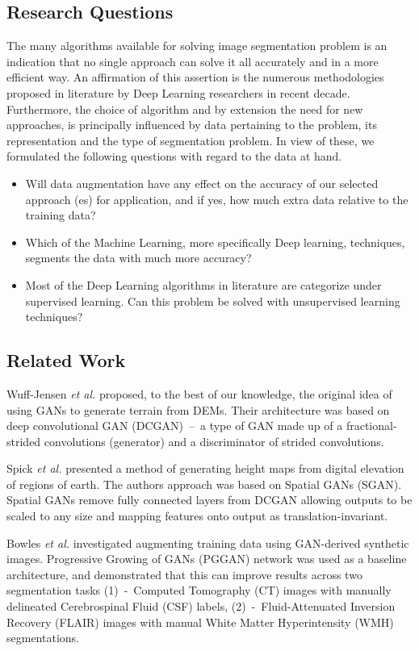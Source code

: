\documentclass[sigconf,natbib=false]{acmart}
\begin{document}
\subsection{Research Questions}
The many algorithms available for solving image segmentation problem is an
indication that no single approach can solve it all accurately and in a more
efficient way. An affirmation of this assertion is the numerous methodologies
proposed in literature by Deep Learning researchers in recent decade.
Furthermore, the choice of algorithm and by extension the need for new
approaches, is principally influenced by data pertaining to the problem, its
representation and the type of segmentation problem.
In view of these, we formulated the following questions with regard to the data
at hand.
\begin{itemize}
    \item Will data augmentation have any effect on the accuracy of our selected
        approach (es) for application, and if yes, how much extra data relative
        to the training data?
    \item Which of the Machine Learning, more specifically Deep learning,
        techniques, segments the data with much more accuracy?
    \item Most of the Deep Learning algorithms in literature are categorize
        under supervised learning. Can this problem be solved with unsupervised
        learning techniques?
\end{itemize}
\subsection{Related Work}
Wuff-Jensen \textit{et al.} proposed, to the best of our knowledge, the original
idea of using GANs to generate terrain from DEMs. Their architecture was based
on deep convolutional GAN (DCGAN)\cite{RMC}~--~a type of GAN made up of a
fractional-strided convolutions (generator) and a discriminator of strided
convolutions.\par
Spick \textit{et al.}\cite{SpickCW} presented a method of generating height maps
from digital elevation of regions of earth. The authors approach was based on
Spatial GANs (SGAN)\cite{JetchevBV}. Spatial GANs remove fully connected layers
from DCGAN allowing outputs to be scaled to any size and mapping features onto
output as translation-invariant.\par
Bowles \textit{et al.}\cite{bowles2018gan} investigated augmenting training data
using GAN-derived synthetic images. Progressive Growing of GANs
(PGGAN)\cite{KarrasAJ} network was used as a baseline architecture, and
demonstrated that this can improve results across two segmentation tasks
(1)~-~Computed Tomography (CT) images with manually delineated Cerebrospinal
Fluid (CSF) labels, (2)~-~Fluid-Attenuated Inversion Recovery (FLAIR) images
with manual White Matter Hyperintensity (WMH) segmentations.
\end{document}
